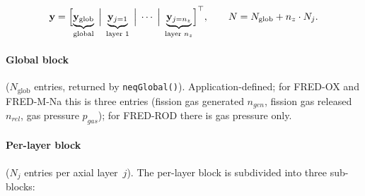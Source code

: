 \documentclass[11pt,a4paper]{article}
\begin{document}
\begin{equation}
  \mathbf{y} = \Bigl[
    \underbrace{\mathbf{y}_\mathrm{glob}}_{\text{global}}
    \;\Big|\;
    \underbrace{\mathbf{y}_{j=1}}_{\text{layer }1}
    \;\Big|\;
    \cdots
    \;\Big|\;
    \underbrace{\mathbf{y}_{j=n_z}}_{\text{layer }n_z}
  \Bigr]^\top,
  \qquad
  N = N_\mathrm{glob} + n_z \cdot N_j.
  \label{eq:y_layout}
\end{equation}

\paragraph{Global block} ($N_\mathrm{glob}$ entries, returned by \texttt{neqGlobal()}).
Application-defined; for FRED-OX and FRED-M-Na this is three entries (fission gas generated $n_{gen}$, fission gas released $n_{rel}$, gas pressure $p_{gas}$); for FRED-ROD there is gas pressure only.

\paragraph{Per-layer block} ($N_j$ entries per axial layer~$j$).
The per-layer block is subdivided into three sub-blocks:
\end{document}
